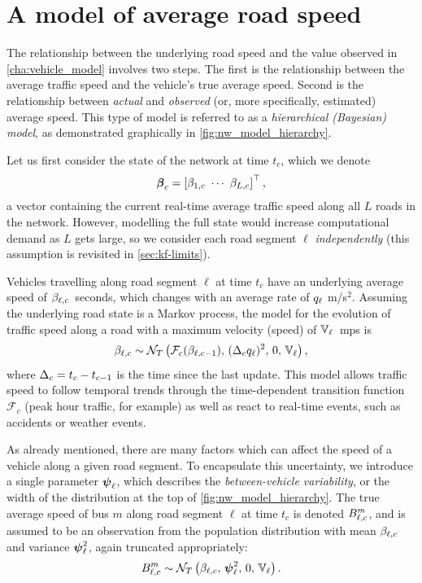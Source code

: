 \section{A model of average road speed}
\label{sec:nw_model}


The relationship between the underlying road speed and the value observed in \cref{cha:vehicle_model} involves two steps. The first is the relationship between the average traffic speed and the vehicle's true average speed. Second is the relationship between \emph{actual} and \emph{observed} (or, more specifically, estimated) average speed. This type of model is referred to as a \emph{hierarchical (Bayesian) model}, as demonstrated graphically in \cref{fig:nw_model_hierarchy}.


Let us first consider the state of the network at time $t_c$, which we denote
\begin{equation}\label{eq:nw_state}
\boldsymbol{\beta}_c =
\left[\beta_{1,c}\ \cdots\ \beta_{L,c}\right]^\top,
\end{equation}
a vector containing the current real-time average traffic speed along all $L$ roads in the network. However, modelling the full state would increase computational demand as $L$ gets large, so we consider each road segment $\ell$ \emph{independently} (this assumption is revisited in \cref{sec:kf-limits}).


Vehicles travelling along road segment $\ell$ at time $t_c$ have an underlying average speed of $\beta_{\ell,c}$~seconds, which changes with an average rate of $q_\ell$ m/s$^2$. Assuming the underlying road state is a Markov process, the model for the evolution of traffic speed along a road with a maximum velocity (speed) of $\mathbb{V}_\ell$~\gls{mps} is
\begin{equation}\label{eq:nw_state_markov}
\beta_{\ell,c} \sim
\mathcal{N}_T\left(\mathcal{F}_c(\beta_{\ell,c-1}),\, (\Delta_c q_\ell)^2,\, 0,\, \mathbb{V}_\ell\right),
\end{equation}
where $\Delta_c = t_c - t_{c-1}$ is the time since the last update. This model allows traffic speed to follow temporal trends through the time-dependent transition function $\mathcal{F}_c$ (peak hour traffic, for example) as well as react to real-time events, such as accidents or weather events.


As already mentioned, there are many factors which can affect the speed of a vehicle along a given road segment. To encapsulate this uncertainty, we introduce a single parameter $\mathbf{\boldsymbol{\psi}}_{\ell}$, which describes the \emph{between-vehicle variability}, or the width of the distribution at the top of \cref{fig:nw_model_hierarchy}. The true average speed of bus $m$ along road segment $\ell$ at time $t_c$ is denoted $B_{\ell,c}^m$, and is assumed to be an observation from the population distribution with mean $\beta_{\ell,c}$ and variance $\mathbf{\boldsymbol{\psi}}_{\ell}^2$, again truncated appropriately:
\begin{equation}\label{eq:nw_vehicle_tt}
B_{\ell,c}^m \sim
\mathcal{N}_T\left(\beta_{\ell,c},\, \mathbf{\boldsymbol{\psi}}_{\ell}^2,\, 0,\, \mathbb{V}_\ell\right).
\end{equation}



